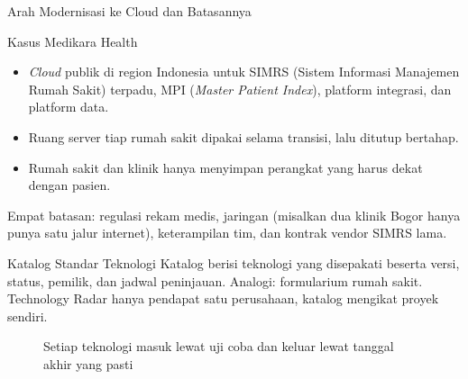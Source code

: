 \documentclass[aspectratio=169, table, 12pt]{beamer}
\begin{document}
\begin{frame}{{\Large Arah Modernisasi ke Cloud dan Batasannya}}
  \begin{block}{Kasus Medikara Health}
    \small
    \begin{itemize}
      \item \textit{Cloud} publik di region Indonesia untuk SIMRS (Sistem Informasi Manajemen Rumah
            Sakit) terpadu, MPI (\textit{Master Patient Index}), platform integrasi, dan platform data.
      \item Ruang server tiap rumah sakit dipakai selama transisi, lalu ditutup bertahap.
      \item Rumah sakit dan klinik hanya menyimpan perangkat yang harus dekat dengan pasien.
    \end{itemize}
    \vspace{4pt}
    Empat batasan: regulasi rekam medis, jaringan (misalkan dua klinik Bogor hanya punya satu jalur
    internet), keterampilan tim, dan kontrak vendor SIMRS lama.
  \end{block}
\end{frame}

\begin{frame}{{\Large Katalog Standar Teknologi}}
  \small Katalog berisi teknologi yang disepakati beserta versi, status, pemilik, dan jadwal peninjauan.
  Analogi: formularium rumah sakit. Technology Radar hanya pendapat satu perusahaan, katalog mengikat
  proyek sendiri.

  \centering
  \begin{figure}
    \resizebox{0.84\textwidth}{!}{}
    \caption{Setiap teknologi masuk lewat uji coba dan keluar lewat tanggal akhir yang pasti}
  \end{figure}
\end{frame}
\end{document}
